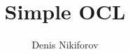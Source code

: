 \documentclass[11pt,a4paper]{book}
\makeatletter
\newenvironment{abstract}{%
  \small
  \begin{center}%
    {\bfseries \abstractname\vspace{-.5em}\vspace{\z@}}%
  \end{center}%
  \quotation}{\endquotation}
\makeatother
\begin{document}
\title{Simple OCL}
\author{Denis Nikiforov}
\maketitle


\tableofcontents


\end{document}
